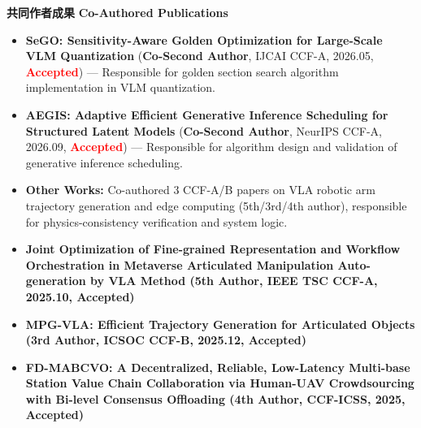 \documentclass[11pt]{article}
\begin{document}
\textbf{共同作者成果}
\textbf{Co-Authored Publications}
\begin{itemize}
    \item \textbf{SeGO: Sensitivity-Aware Golden Optimization for Large-Scale VLM Quantization} ({\small\textbf{Co-Second Author}, IJCAI CCF-A, 2026.05, \textcolor{red}{\textbf{Accepted}}}) {\small --- Responsible for golden section search algorithm implementation in VLM quantization.}
    \item \textbf{AEGIS: Adaptive Efficient Generative Inference Scheduling for Structured Latent Models} ({\small\textbf{Co-Second Author}, NeurIPS CCF-A, 2026.09, \textcolor{red}{\textbf{Accepted}}}) {\small --- Responsible for algorithm design and validation of generative inference scheduling.}
    \item \textbf{Other Works:} Co-authored 3 CCF-A/B papers on VLA robotic arm trajectory generation and edge computing (5th/3rd/4th author), responsible for physics-consistency verification and system logic.
    \item \textbf{Joint Optimization of Fine-grained Representation and Workflow Orchestration in Metaverse Articulated Manipulation Auto-generation by VLA Method (\textbf{5th Author}, IEEE TSC CCF-A, 2025.10, Accepted)}
    \item \textbf{MPG-VLA: Efficient Trajectory Generation for Articulated Objects (\textbf{3rd Author}, ICSOC CCF-B, 2025.12, Accepted)}
    \item \textbf{FD-MABCVO: A Decentralized, Reliable, Low-Latency Multi-base Station Value Chain Collaboration via Human-UAV Crowdsourcing with Bi-level Consensus Offloading (\textbf{4th Author}, CCF-ICSS, 2025, Accepted)}
\end{itemize}


\end{document}
